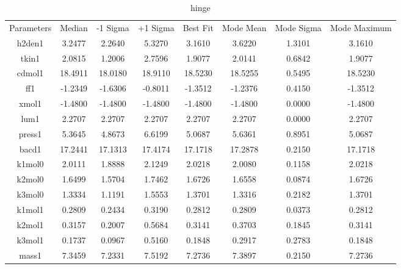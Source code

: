 \begin{table}
\caption{hinge}
\begin{tabular}{cccccccc}
Parameters & Median & -1 Sigma & +1 Sigma & Best Fit & Mode Mean & Mode Sigma & Mode Maximum \\
h2den1 & 3.2477 & 2.2640 & 5.3270 & 3.1610 & 3.6220 & 1.3101 & 3.1610 \\
tkin1 & 2.0815 & 1.2006 & 2.7596 & 1.9077 & 2.0141 & 0.6842 & 1.9077 \\
cdmol1 & 18.4911 & 18.0180 & 18.9110 & 18.5230 & 18.5255 & 0.5495 & 18.5230 \\
ff1 & -1.2349 & -1.6306 & -0.8011 & -1.3512 & -1.2376 & 0.4150 & -1.3512 \\
xmol1 & -1.4800 & -1.4800 & -1.4800 & -1.4800 & -1.4800 & 0.0000 & -1.4800 \\
lum1 & 2.2707 & 2.2707 & 2.2707 & 2.2707 & 2.2707 & 0.0000 & 2.2707 \\
press1 & 5.3645 & 4.8673 & 6.6199 & 5.0687 & 5.6361 & 0.8951 & 5.0687 \\
bacd1 & 17.2441 & 17.1313 & 17.4174 & 17.1718 & 17.2878 & 0.2150 & 17.1718 \\
k1mol0 & 2.0111 & 1.8888 & 2.1249 & 2.0218 & 2.0080 & 0.1158 & 2.0218 \\
k2mol0 & 1.6499 & 1.5704 & 1.7462 & 1.6726 & 1.6558 & 0.0874 & 1.6726 \\
k3mol0 & 1.3334 & 1.1191 & 1.5553 & 1.3701 & 1.3316 & 0.2182 & 1.3701 \\
k1mol1 & 0.2809 & 0.2434 & 0.3190 & 0.2812 & 0.2809 & 0.0373 & 0.2812 \\
k2mol1 & 0.3157 & 0.2007 & 0.5684 & 0.3141 & 0.3703 & 0.1845 & 0.3141 \\
k3mol1 & 0.1737 & 0.0967 & 0.5160 & 0.1848 & 0.2917 & 0.2783 & 0.1848 \\
mass1 & 7.3459 & 7.2331 & 7.5192 & 7.2736 & 7.3897 & 0.2150 & 7.2736 \\
\end{tabular}
\end{table}
